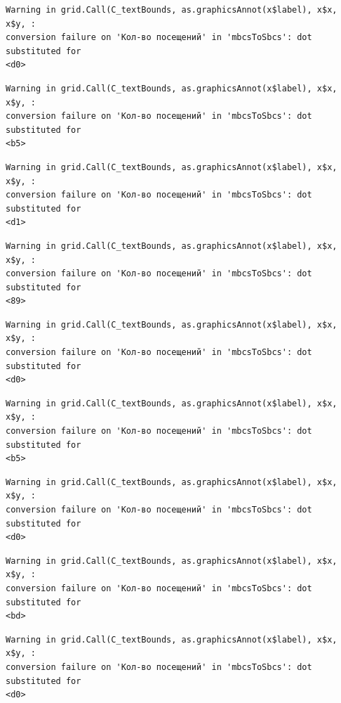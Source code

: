 \documentclass[
  letterpaper,
  DIV=11,
  numbers=noendperiod]{scrartcl}
\begin{document}
\begin{verbatim}
Warning in grid.Call(C_textBounds, as.graphicsAnnot(x$label), x$x, x$y, :
conversion failure on 'Кол-во посещений' in 'mbcsToSbcs': dot substituted for
<d0>
\end{verbatim}

\begin{verbatim}
Warning in grid.Call(C_textBounds, as.graphicsAnnot(x$label), x$x, x$y, :
conversion failure on 'Кол-во посещений' in 'mbcsToSbcs': dot substituted for
<b5>
\end{verbatim}

\begin{verbatim}
Warning in grid.Call(C_textBounds, as.graphicsAnnot(x$label), x$x, x$y, :
conversion failure on 'Кол-во посещений' in 'mbcsToSbcs': dot substituted for
<d1>
\end{verbatim}

\begin{verbatim}
Warning in grid.Call(C_textBounds, as.graphicsAnnot(x$label), x$x, x$y, :
conversion failure on 'Кол-во посещений' in 'mbcsToSbcs': dot substituted for
<89>
\end{verbatim}

\begin{verbatim}
Warning in grid.Call(C_textBounds, as.graphicsAnnot(x$label), x$x, x$y, :
conversion failure on 'Кол-во посещений' in 'mbcsToSbcs': dot substituted for
<d0>
\end{verbatim}

\begin{verbatim}
Warning in grid.Call(C_textBounds, as.graphicsAnnot(x$label), x$x, x$y, :
conversion failure on 'Кол-во посещений' in 'mbcsToSbcs': dot substituted for
<b5>
\end{verbatim}

\begin{verbatim}
Warning in grid.Call(C_textBounds, as.graphicsAnnot(x$label), x$x, x$y, :
conversion failure on 'Кол-во посещений' in 'mbcsToSbcs': dot substituted for
<d0>
\end{verbatim}

\begin{verbatim}
Warning in grid.Call(C_textBounds, as.graphicsAnnot(x$label), x$x, x$y, :
conversion failure on 'Кол-во посещений' in 'mbcsToSbcs': dot substituted for
<bd>
\end{verbatim}

\begin{verbatim}
Warning in grid.Call(C_textBounds, as.graphicsAnnot(x$label), x$x, x$y, :
conversion failure on 'Кол-во посещений' in 'mbcsToSbcs': dot substituted for
<d0>
\end{verbatim}
\end{document}
